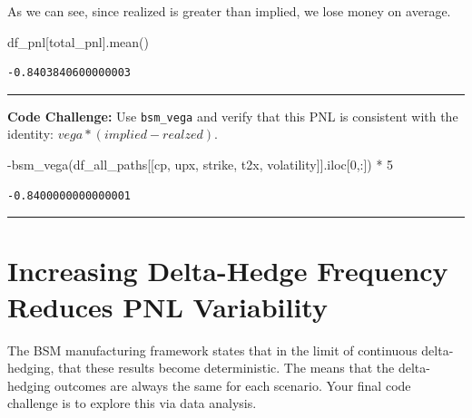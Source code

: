 \documentclass[
  letterpaper,
  DIV=11,
  numbers=noendperiod]{scrreprt}
\newenvironment{Shaded}{\begin{snugshade}}{\end{snugshade}}
\newcommand{\DecValTok}[1]{\textcolor[rgb]{0.68,0.00,0.00}{#1}}
\newcommand{\NormalTok}[1]{\textcolor[rgb]{0.00,0.23,0.31}{#1}}
\newcommand{\OperatorTok}[1]{\textcolor[rgb]{0.37,0.37,0.37}{#1}}
\newcommand{\StringTok}[1]{\textcolor[rgb]{0.13,0.47,0.30}{#1}}
\begin{document}
As we can see, since realized is greater than implied, we lose money on
average.

\begin{Shaded}
\begin{Highlighting}[]
\NormalTok{df\_pnl[}\StringTok{\textquotesingle{}total\_pnl\textquotesingle{}}\NormalTok{].mean()}
\end{Highlighting}
\end{Shaded}

\begin{verbatim}
-0.8403840600000003
\end{verbatim}

\begin{center}\rule{0.5\linewidth}{0.5pt}\end{center}

\textbf{Code Challenge:} Use \texttt{bsm\_vega} and verify that this PNL
is consistent with the identity: \(vega * (implied - realzed)\).

\begin{Shaded}
\begin{Highlighting}[]
\OperatorTok{{-}}\NormalTok{bsm\_vega(df\_all\_paths[[}\StringTok{\textquotesingle{}cp\textquotesingle{}}\NormalTok{, }\StringTok{\textquotesingle{}upx\textquotesingle{}}\NormalTok{, }\StringTok{\textquotesingle{}strike\textquotesingle{}}\NormalTok{, }\StringTok{\textquotesingle{}t2x\textquotesingle{}}\NormalTok{, }\StringTok{\textquotesingle{}volatility\textquotesingle{}}\NormalTok{]].iloc[}\DecValTok{0}\NormalTok{,:]) }\OperatorTok{*} \DecValTok{5}
\end{Highlighting}
\end{Shaded}

\begin{verbatim}
-0.8400000000000001
\end{verbatim}

\begin{center}\rule{0.5\linewidth}{0.5pt}\end{center}

\hypertarget{increasing-delta-hedge-frequency-reduces-pnl-variability}{%
\section{Increasing Delta-Hedge Frequency Reduces PNL
Variability}\label{increasing-delta-hedge-frequency-reduces-pnl-variability}}

The BSM manufacturing framework states that in the limit of continuous
delta-hedging, that these results become deterministic. The means that
the delta-hedging outcomes are always the same for each scenario. Your
final code challenge is to explore this via data analysis.
\end{document}
